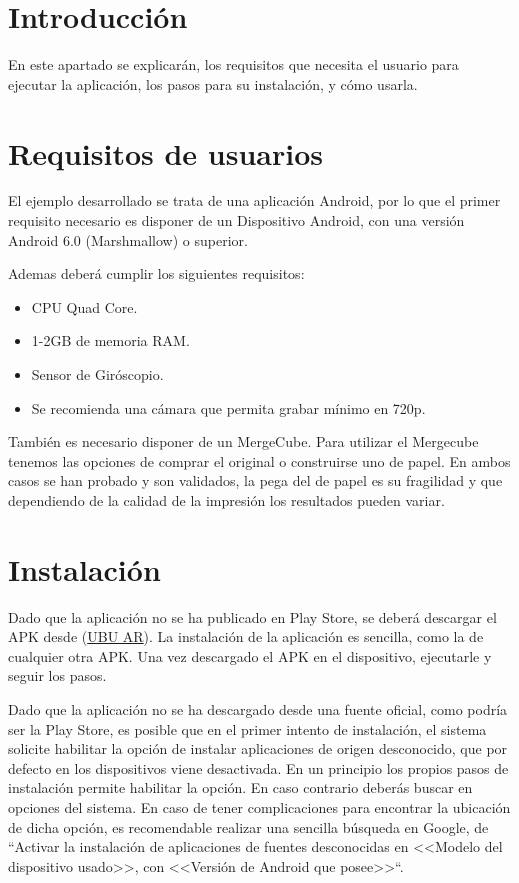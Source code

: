 
\section{Introducción}
 En este apartado se explicarán, los requisitos que necesita el usuario para ejecutar la aplicación, los pasos para su instalación, y cómo usarla.
  
\section{Requisitos de usuarios}
 El ejemplo desarrollado se trata de una aplicación Android, por lo que el primer requisito necesario es disponer de un Dispositivo Android, con una versión Android 6.0 (Marshmallow) o superior.
  
 Ademas deberá cumplir los siguientes requisitos\cite{vuforia_devices}:
 \begin{itemize}
 	\item CPU Quad Core.
 	\item 1-2GB de memoria RAM.
 	\item Sensor de Giróscopio.
 	\item Se recomienda una cámara que permita grabar mínimo en 720p.  
 \end{itemize}
También es necesario disponer de un MergeCube. Para utilizar el Mergecube tenemos las opciones de comprar el original o construirse uno de papel. En ambos casos se han probado y son validados, la pega del de papel es su fragilidad y que dependiendo de la calidad de la impresión los resultados pueden variar.

\section{Instalación}

Dado que la aplicación no se ha publicado en Play Store, se deberá descargar el APK desde (\href{https://github.com/smi0010/TFG_Herramientas_Realidad_Aumentada/releases/tag/UBU_AR}{UBU AR}).
La instalación de la aplicación es sencilla, como la de cualquier otra APK. Una vez descargado el APK en el dispositivo, ejecutarle y seguir los pasos. 

Dado que la aplicación no se ha descargado desde una fuente oficial, como podría ser la Play Store, es posible que en el primer intento de instalación, el sistema solicite habilitar la opción de instalar aplicaciones de origen desconocido, que por defecto en los dispositivos viene desactivada.
En un principio los propios pasos de instalación permite habilitar la opción. En caso contrario deberás buscar en opciones del sistema. En caso de tener complicaciones para encontrar la ubicación de dicha opción, es recomendable realizar una sencilla búsqueda en Google, de ``Activar la instalación de aplicaciones de fuentes desconocidas en <<Modelo del dispositivo usado>>, con <<Versión de Android que posee>>``.


